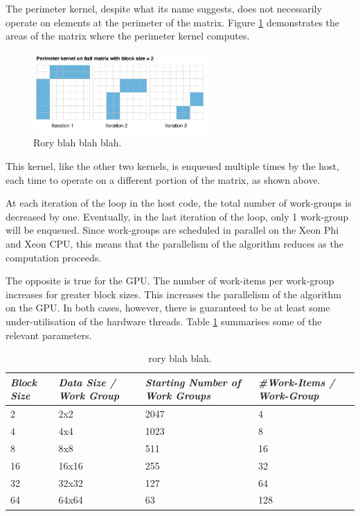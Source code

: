 \par{The perimeter kernel, despite what its name suggests, does not necessarily operate on elements 
    at the perimeter of the matrix. Figure \ref{PerimeterKernel2} demonstrates the areas of the matrix where the 
    perimeter kernel computes.}

\begin{figure}[!h]
    \centering
    \includegraphics[width=0.6\textwidth]{figures/PerimeterKernel2.png}
    \caption{Rory blah blah blah.}
    \label{PerimeterKernel2}
\end{figure}

\par{This kernel, like the other two kernels, is enqueued multiple times by the host, each 
    time to operate on a different portion of the matrix, as shown above.}

\par{At each iteration of the loop in the host code, the total number of work-groups is decreased by one. 
    Eventually, in the last iteration of the loop, only 1 work-group will be enqueued. 
    Since work-groups are scheduled in parallel on the Xeon Phi and Xeon CPU, 
    this means that the parallelism of the algorithm reduces as the computation proceeds.}

\par{The opposite is true for the GPU. The number of work-items per work-group increases for greater block sizes. 
    This increases the parallelism of the algorithm on the GPU. In both cases, however, 
    there is guaranteed to be at least some under-utilisation of the hardware threads. 
    Table \ref{tab:lu2} summarises some of the relevant parameters.}

\begin{table}[!h]
    \centering
    \begin{tabular}{| l | l | l | l |}
    \hline
    \emph{Block Size} & \emph{Data Size / Work Group} & \emph{Starting Number of Work Groups} & \emph{\#Work-Items / Work-Group} \\ \hline
    2 & 2x2 & 2047 & 4 \\ \hline
    4 & 4x4 & 1023 & 8 \\ \hline
    8 & 8x8 & 511 & 16 \\ \hline
    16 & 16x16 & 255 & 32 \\ \hline
    32 & 32x32 & 127 & 64 \\ \hline
    64 & 64x64 & 63 & 128 \\ \hline
    \end{tabular}
    \caption{rory blah blah.}
    \label{tab:lu2}
\end{table}

